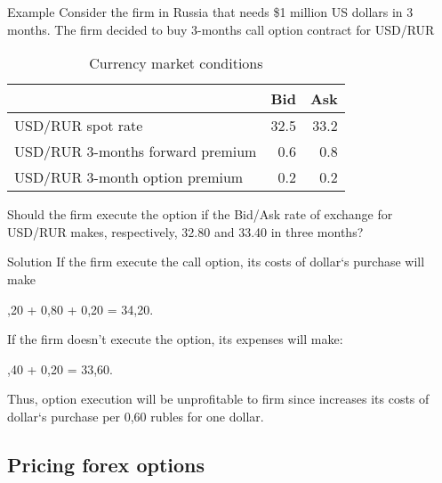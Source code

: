 \documentclass[international_finance_p1.tex]{subfiles}
\begin{document}
\begin{frame}[shrink=10]{}
\begin{exampleblock}{Example}
Consider the firm in Russia that needs \$1 million US dollars in 3 months. The firm decided to buy 3-months call option contract for USD/RUR
\begin{table}[htbp]
  \centering
  \caption{Currency market conditions}
    \begin{tabular}{lrr}
    \toprule
          & Bid   & Ask \\
    \midrule
    USD/RUR spot rate & 32.5  & 33.2 \\
    USD/RUR 3-months forward premium & 0.6   & 0.8 \\
    USD/RUR 3-month option premium & 0.2   & 0.2 \\
    \bottomrule
    \end{tabular}%
  \label{tab:addlabel}%
\end{table}%
Should the firm execute the option if the Bid/Ask rate of exchange for USD/RUR makes, respectively, 32.80 and 33.40 in three months?
\end{exampleblock}
\end{frame}
\begin{frame}{}
\begin{exampleblock}{Solution}
If the firm execute the call option, its costs of dollar`s purchase will make 

,20 + 0,80 + 0,20 = 34,20.

If the firm doesn't execute the option, its expenses will make:

,40 + 0,20 = 33,60.

Thus, option execution will be unprofitable to firm since increases its costs of dollar`s purchase per 0,60 rubles for one dollar.
\end{exampleblock}
\end{frame}
\subsection{Pricing forex options}
\end{document}
